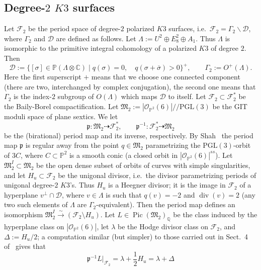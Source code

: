 \documentclass[11pt]{amsart}
\numberwithin{equation}{section}
\theoremstyle{plain}
\theoremstyle{remark}
\theoremstyle{definition}
\def\Pic{\operatorname{Pic}}
\newcommand{\cF}{\mathscr{F}}
\newcommand{\gp}{\mathfrak{p}}
\newcommand{\PGL}{\mathrm{PGL}}
\newcommand{\gquot}{/\!\!/}
\newcommand{\CC}{{\mathbb C}}
\newcommand{\cD}{{\mathscr D}}
\newcommand{\cO}{{\mathscr O}}
\newcommand{\dra}{\dashrightarrow}
\newcommand{\gM}{\mathfrak{M}}
\newcommand{\lra}{\longrightarrow}
\newcommand{\ov}{\overline}
\newcommand{\PP}{{\mathbb P}}
\newcommand{\QQ}{{\mathbb Q}}
\DeclareMathOperator{\divisore}{div}
\begin{document}
\subsection{Degree-$2$ $K3$ surfaces}\label{subsec:degtwo}
%
Let $\cF_2$ be the period space of  degree-$2$ polarized $K3$ surfaces, i.e.~$\cF_2=\Gamma_2\backslash\cD$, where   $\Gamma_2$ and $\cD$ are defined as follows. Let $\Lambda:=U^2\oplus E_8^2\oplus A_1$. Thus  $\Lambda$ is isomorphic to the primitive integral cohomology of a polarized $K3$ of degree $2$. Then
%
\begin{equation}\label{howmanytimes}
%
\cD:=\{[\sigma]\in\PP(\Lambda\otimes\CC) \mid q(\sigma)=0,\quad q(\sigma+\ov{\sigma})>0\}^{+},\qquad \Gamma_2:= O^{+}(\Lambda).
%
\end{equation}
%
Here the first superscript $+$ means that we choose one connected component (there are two, interchanged by complex conjugation), the second one means that $\Gamma_2$ is the index-$2$ subgroup of $O(\Lambda)$ which maps $\cD$ to itself.
Let $\cF_2\subset\cF_2^{*}$ be the Baily-Borel compactification. Let $\gM_2:=|\cO_{\PP^2}(6)|\gquot\PGL(3)$ be the GIT moduli space of plane sextics. 
We let
%
\begin{equation*}
%
\gp\colon\gM_2\dra\cF_2^{*},\qquad \gp^{-1}\colon\cF_2^{*}\dra\gM_2
%
\end{equation*}
%
be the (birational) period map and its inverse, respectively. By Shah~\cite{shah} the period map $\gp$ is regular away from the point $q\in\gM_2$  parametrizing the  $\PGL(3)$-orbit of 
 $3C$, where $C\subset\PP^2$ is a smooth conic (a closed orbit in $|\cO_{\PP^2}(6)|^{ss}$). Let $\gM_2^{I}\subset\gM_2$ be the open dense subset of orbits of curves with simple singularities, and let $H_u\subset\cF_2$ be the unigonal divisor, i.e.~the divisor parametrizing periods of unigonal degree-$2$ $K3$'s. Thus $H_u$ is a Heegner divisor; it is the image in $\cF_2$ of a hyperplane $v^{\bot}\cap\cD$, where $v\in\Lambda$ is such that $q(v)=-2$ and $\divisore(v)=2$  (any two such elements of $\Lambda$ are $\Gamma_2$-equivalent). Then 
  the period map defines an isomorphism $\gM_2^{I}\overset{\sim}{\lra}(\cF_2\setminus H_u)$. Let $L\in\Pic(\gM_2)_{\QQ}$ be the class induced by the hyperplane class on 
 $|\cO_{\PP^2}(6)|$, let
  $\lambda$ be the Hodge divisor class on $\cF_2$, and $\Delta:=H_u/2$;  a computation similar (but simpler) to those carried out in Sect.~4 of~\cite{log1} gives that 
 \begin{equation}\label{keypull}
%
\gp^{-1}L|_{\cF_2}=\lambda+\frac{1}{2}H_u=\lambda+\Delta
%
\end{equation}
\end{document}
